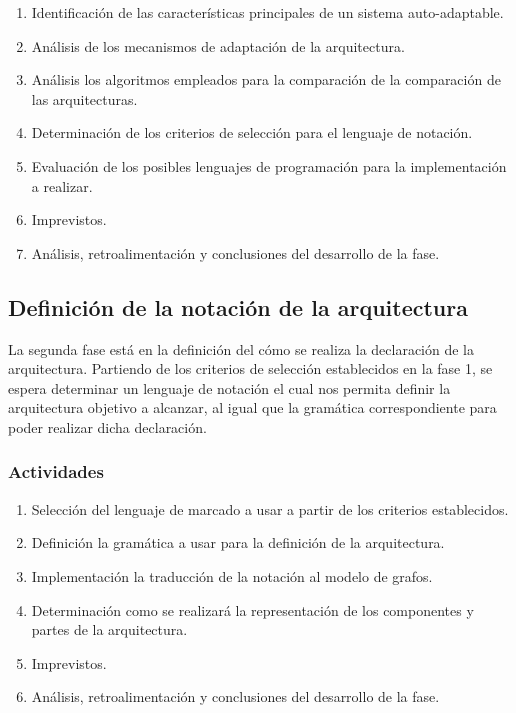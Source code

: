 \documentclass[12pt]{article}
\begin{document}
    \begin{enumerate}[label=\thesubsection.\arabic*., wide, labelindent=2em, leftmargin=5em]
        \item Identificación de las características principales de un sistema auto-adaptable.
        \item Análisis de los mecanismos de adaptación de la arquitectura.
        \item Análisis los algoritmos empleados para la comparación de la comparación de las arquitecturas.
        \item Determinación de los criterios de selección para el lenguaje de notación.
        \item Evaluación de los posibles lenguajes de programación para la implementación a realizar.
        \item Imprevistos.
        \item Análisis, retroalimentación y conclusiones del desarrollo de la fase. 
    \end{enumerate} 

    \subsection{Definición de la notación de la arquitectura}
    
    La segunda fase está en la definición del cómo se realiza la declaración de la arquitectura. Partiendo de los criterios de selección establecidos en la fase 1, se espera determinar un lenguaje de notación el cual nos permita definir la arquitectura objetivo a alcanzar, al igual que la gramática correspondiente para poder realizar dicha declaración. 
    
    \subsubsection*{Actividades}

    \begin{enumerate}[label=\thesubsection.\arabic*., wide, labelindent=2em, leftmargin=5em]
        \item Selección del lenguaje de marcado a usar a partir de los criterios establecidos.
        \item Definición la gramática a usar para la definición de la arquitectura.
        \item Implementación la traducción de la notación al modelo de grafos. %
        \item Determinación como se realizará la representación de los componentes y partes de la arquitectura.
        \item Imprevistos.
        \item Análisis, retroalimentación y conclusiones del desarrollo de la fase. 
    \end{enumerate}    
\end{document}
